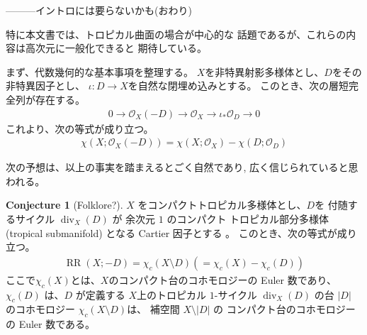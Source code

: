 \documentclass[a4paper,dvipdfmx,reqno,12pt]{amsart}
\theoremstyle{definition}
\newtheorem{conjecture}[theorem]{Conjecture}
\newcommand{\opn}[1]{\operatorname{#1}}
\numberwithin{equation}{section}
\begin{document}
---------イントロには要らないかも(おわり)


特に本文書では、トロピカル曲面の場合が中心的な
話題であるが、これらの内容は高次元に一般化できると
期待している。

まず、代数幾何的な基本事項を整理する。
$X$を非特異射影多様体とし、$D$をその非特異因子とし、
$\iota\colon D\to X$を自然な閉埋め込みとする。
このとき、次の層短完全列が存在する。
\begin{align}
     0\to \mathcal{O}_X(-D)\to 
\mathcal{O}_X\to \iota_*\mathcal{O}_D\to 0
\end{align}
これより、次の等式が成り立つ。
\begin{align}
\chi(X;\mathcal{O}_X(-D))=\chi(X;\mathcal{O}_X)
-\chi(D;\mathcal{O}_D)
\end{align}

次の予想は、以上の事実を踏まえるとごく自然であり,
広く信じられていると思われる。

\begin{conjecture}[{Folklore?}]
\label{conjecture-rr-c-euler}
$X$ をコンパクトトロピカル多様体とし、$D$を
付随するサイクル $\opn{div}_X(D)$ が
余次元 $1$
のコンパクト
トロピカル部分多様体(tropical submanifold)
となる Cartier 因子とする
\cite[Definition 2.14]{demedrano2023chern}。
このとき、次の等式が成り立つ。
\begin{align}
\opn{RR}(X;-D)=
\chi_c (X\setminus D) (=\chi_c (X)-\chi_c(D))
\end{align}
ここで$\chi_c(X)$とは、$X$のコンパクト台のコホモロジーの
Euler 数であり、
$\chi_c(D)$ は、$D$ が定義する
$X$上のトロピカル $1$-サイクル $\opn{div}_X(D)$
の台 $|D|$ のコホモロジー
$\chi_c(X\setminus D)$は、
補空間 $X\setminus |D|$ の コンパクト台のコホモロジーの
Euler 数である。
\end{conjecture}
\end{document}
